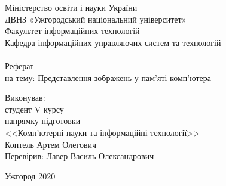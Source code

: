 \begin{center}

    \large Міністерство освіти і науки України\\
    ДВНЗ «Ужгородський національний університет»\\
    Факультет інформаційних технологій\\
    Кафедра інформаційних управляючих систем та технологій\\
    \\[5.5cm]

    \huge Реферат \\[0.6cm] %
    \large на тему:  {Представлення зображень \linebreak у пам’яті комп’ютера}\\[3.7cm]


\end{center}

\begin{flushright}
    Виконував:\\
    студент V курсу\\
    напрямку підготовки\\
    <<Комп’ютерні науки та інформаційні технології>> \\
    Коптель Артем Олегович \\
    Перевірив: Лавер Василь Олександрович
\end{flushright}


\vfill

\begin{center}
    \large Ужгород 2020
\end{center}

\thispagestyle{empty}
